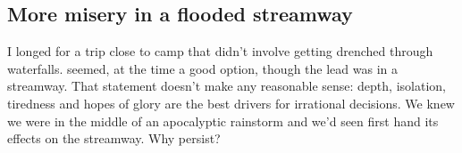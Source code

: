 
\subsection{More misery in a flooded streamway}
I longed for a trip close to camp that didn't involve getting drenched through waterfalls.  seemed, at the time a good option, though the lead was in a streamway. That statement doesn't make any reasonable sense: depth, isolation, tiredness and hopes of glory are the best drivers for irrational decisions. We knew we were in the middle of an apocalyptic rainstorm and we'd seen first hand its effects on the  streamway. Why persist?

